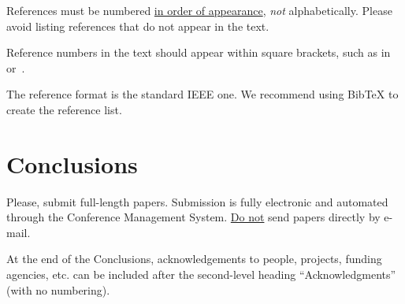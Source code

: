 \documentclass{article}
\begin{document}
References must be numbered {\ul {in order of appearance}}, {\em not} alphabetically. Please avoid listing references that do not appear in the text.

Reference numbers in the text should appear within square brackets, such as 
in~\cite{Someone:09} or~\cite{Someone:04,Someone:13}.

The reference format is the standard IEEE one. We recommend using BibTeX to create the reference list.


\section{Conclusions}
Please, submit full-length papers. Submission is fully electronic and automated through the Conference Management System. 
{\ul{Do not}} send papers directly by e-mail.

\begin{acknowledgments}
At the end of the Conclusions, acknowledgements to people, projects, funding agencies, etc. can be included after the second-level heading ``Acknowledgments'' (with no numbering).
\end{acknowledgments} 


\end{document}
